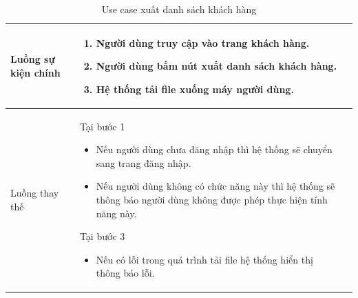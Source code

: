 \documentclass[12pt,a4paper]{article}
\begin{document}
\begin{table}[H]
\begin{tabular}{|p{3.5cm}|p{11.5cm}|c|}
            Luồng sự kiện chính & \vspace{-.8cm}\begin{enumerate}
                                                    \item Người dùng truy cập vào trang khách hàng.
                                                    \item Người dùng bấm nút xuất danh sách khách hàng.
                                                    \item Hệ thống tải file xuống máy người dùng.
            \end{enumerate}
            \\
            \hline
            Luồng thay thế & Tại bước 1\newline
            \vspace{-.8cm}\begin{itemize}
                              \item Nếu người dùng chưa đăng nhập thì hệ thống sẽ chuyển sang trang đăng nhập.
                              \item Nếu người dùng không có chức năng này thì hệ thống sẽ thông báo người dùng không được phép thực hiện tính năng này.
            \end{itemize}
            Tại bước 3\newline
            \vspace{-.8cm}\begin{itemize}
                              \item Nếu có lỗi trong quá trình tải file hệ thống hiển thị thông báo lỗi.
            \end{itemize}
            \\ \hline
        \end{tabular}
        \caption{Use case xuất danh sách khách hàng}
    \end{table}


\end{document}
